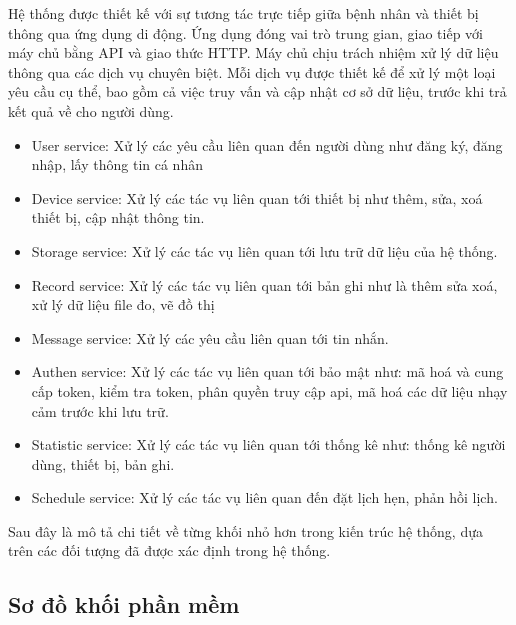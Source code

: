 Hệ thống được thiết kế với sự tương tác trực tiếp giữa bệnh nhân và thiết bị thông qua ứng dụng di động. 
Ứng dụng đóng vai trò trung gian, giao tiếp với máy chủ bằng API và giao thức HTTP. 
Máy chủ chịu trách nhiệm xử lý dữ liệu thông qua các dịch vụ chuyên biệt. 
Mỗi dịch vụ được thiết kế để xử lý một loại yêu cầu cụ thể, bao gồm cả việc truy vấn và cập nhật cơ sở dữ liệu, 
trước khi trả kết quả về cho người dùng.\begin{adjustwidth}{1.5em}{}
\begin{itemize}
  \item User service: Xử lý các yêu cầu liên quan đến người dùng như đăng ký, đăng nhập, lấy thông tin cá nhân
  \item Device service: Xử lý các tác vụ liên quan tới thiết bị như thêm, sửa, xoá thiết bị, cập nhật thông tin.
  \item Storage service: Xử lý các tác vụ liên quan tới lưu trữ dữ liệu của hệ thống.
  \item Record service: Xử lý các tác vụ liên quan tới bản ghi như là thêm sửa xoá, xử lý dữ liệu file đo, vẽ đồ thị
  \item Message service: Xử lý các yêu cầu liên quan tới tin nhắn.
  \item Authen service: Xử lý các tác vụ liên quan tới bảo mật như: mã hoá và cung cấp token, kiểm tra token, phân quyền truy cập api, mã hoá các dữ liệu nhạy cảm trước khi lưu trữ.
  \item Statistic service: Xử lý các tác vụ liên quan tới thống kê như: thống kê người dùng, thiết bị, bản ghi.
  \item Schedule service: Xử lý các tác vụ liên quan đến đặt lịch hẹn, phản hồi lịch.
\end{itemize}
\end{adjustwidth}

Sau đây là mô tả chi tiết về từng khối nhỏ hơn trong kiến trúc hệ thống, dựa trên các đối tượng đã được xác định trong hệ thống.
\newpage
\subsection{Sơ đồ khối phần mềm}

